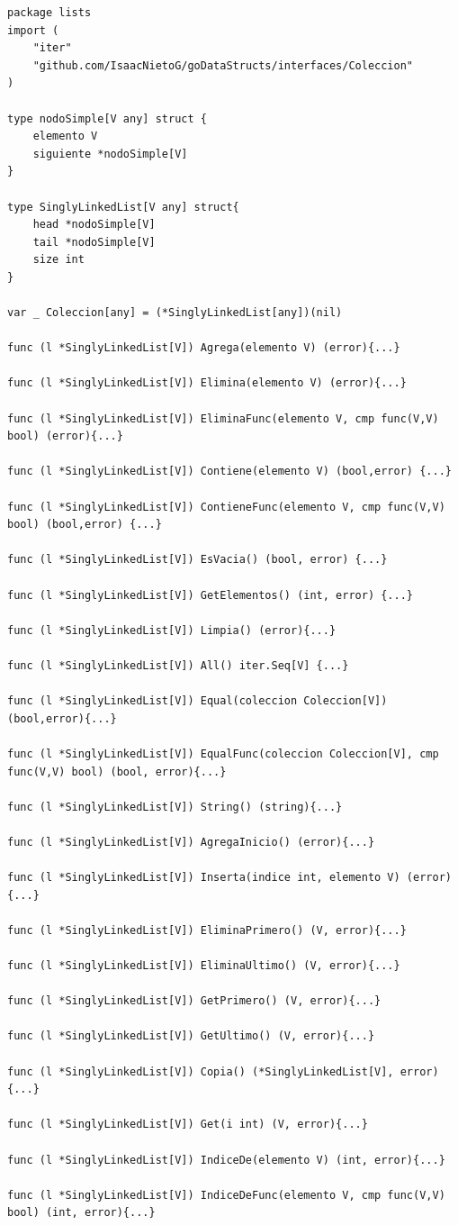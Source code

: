 \documentclass[11pt]{article}
\begin{document}
\begin{verbatim}
package lists
import (
	"iter"
	"github.com/IsaacNietoG/goDataStructs/interfaces/Coleccion"
)

type nodoSimple[V any] struct {
	elemento V
	siguiente *nodoSimple[V]
}

type SinglyLinkedList[V any] struct{
	head *nodoSimple[V]
	tail *nodoSimple[V]
	size int
}

var _ Coleccion[any] = (*SinglyLinkedList[any])(nil)

func (l *SinglyLinkedList[V]) Agrega(elemento V) (error){...}

func (l *SinglyLinkedList[V]) Elimina(elemento V) (error){...}

func (l *SinglyLinkedList[V]) EliminaFunc(elemento V, cmp func(V,V) bool) (error){...}

func (l *SinglyLinkedList[V]) Contiene(elemento V) (bool,error) {...}

func (l *SinglyLinkedList[V]) ContieneFunc(elemento V, cmp func(V,V) bool) (bool,error) {...}

func (l *SinglyLinkedList[V]) EsVacia() (bool, error) {...}

func (l *SinglyLinkedList[V]) GetElementos() (int, error) {...}

func (l *SinglyLinkedList[V]) Limpia() (error){...}

func (l *SinglyLinkedList[V]) All() iter.Seq[V] {...}

func (l *SinglyLinkedList[V]) Equal(coleccion Coleccion[V]) (bool,error){...}

func (l *SinglyLinkedList[V]) EqualFunc(coleccion Coleccion[V], cmp func(V,V) bool) (bool, error){...}

func (l *SinglyLinkedList[V]) String() (string){...}

func (l *SinglyLinkedList[V]) AgregaInicio() (error){...}

func (l *SinglyLinkedList[V]) Inserta(indice int, elemento V) (error){...}

func (l *SinglyLinkedList[V]) EliminaPrimero() (V, error){...}

func (l *SinglyLinkedList[V]) EliminaUltimo() (V, error){...}

func (l *SinglyLinkedList[V]) GetPrimero() (V, error){...}

func (l *SinglyLinkedList[V]) GetUltimo() (V, error){...}

func (l *SinglyLinkedList[V]) Copia() (*SinglyLinkedList[V], error){...}

func (l *SinglyLinkedList[V]) Get(i int) (V, error){...}

func (l *SinglyLinkedList[V]) IndiceDe(elemento V) (int, error){...}

func (l *SinglyLinkedList[V]) IndiceDeFunc(elemento V, cmp func(V,V) bool) (int, error){...}
\end{verbatim}
\end{document}
